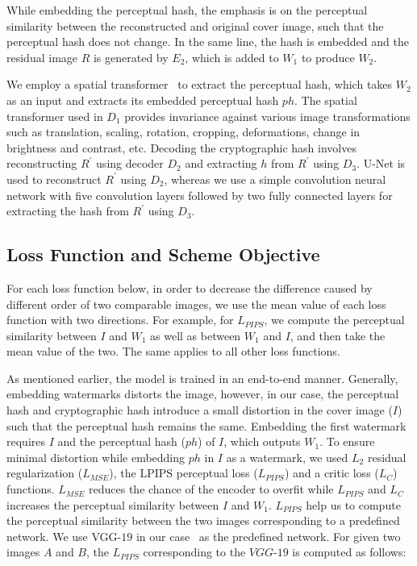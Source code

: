 \documentclass[acmsmall, nonacm]{acmart}
\begin{document}
While embedding the perceptual hash, the emphasis is on the perceptual similarity between the reconstructed and original cover image, such that the perceptual hash does not change. In the same line, the hash is embedded and the residual image $R$ is generated by $E_2$, which is added to $W_1$ to produce $W_2$.

We employ a spatial transformer~\cite{spatial} to extract the perceptual hash, which takes $W_2$ as an input and extracts its embedded perceptual hash $ph$.   The spatial transformer used in $D_1$ provides invariance against various image transformations such as translation, scaling, rotation, cropping, deformations, change in brightness and contrast, etc. Decoding the cryptographic hash involves reconstructing $R^{\prime}$ using decoder $D_2$ and extracting $h$ from $R^{\prime}$ using $D_3$. U-Net is used to reconstruct $R^{\prime}$ using $D_2$,  whereas we use a simple convolution neural network with five convolution layers followed by two fully connected layers for extracting the hash from $R^{\prime}$ using $D_3$.

\subsection{Loss Function and Scheme Objective} \label{subsec:loss-function-and-scheme-objective}

For each loss function below, in order to decrease the difference caused by different order of two comparable images, we use the mean value of each loss function with two directions. For example, for $L_{PIPS}$, we compute the perceptual similarity between $I$ and $W_1$ as well as between $W_1$ and $I$, and then take the mean value of the two. The same applies to all other loss functions.

As mentioned earlier, the model is trained in an end-to-end manner.
Generally, embedding watermarks distorts the image, however, in our case, the perceptual hash and cryptographic hash introduce a small distortion in the cover image ($I$) such that the perceptual hash remains the same. Embedding the first watermark requires $I$ and the perceptual hash ($ph$) of $I$, which outputs $W_1$. To ensure minimal distortion while embedding $ph$ in $I$ as a watermark,  we used $L_2$ residual regularization ($L_{MSE}$), the LPIPS perceptual loss ($L_{PIPS}$) and a critic loss ($L_C$) functions. $L_{MSE}$ reduces the chance of the encoder to overfit while $L_{PIPS}$ and $L_C$ increases the perceptual similarity between $I$ and $W_1$.
$L_{PIPS}$ help us to compute the perceptual similarity between the two images corresponding to a predefined network. We use VGG-$19$ in our case~\cite{lpips} as the predefined network.
For given two images $A$ and $B$, the $L_{PIPS}$ corresponding to the $VGG$-$19$ is computed as follows:
\end{document}
